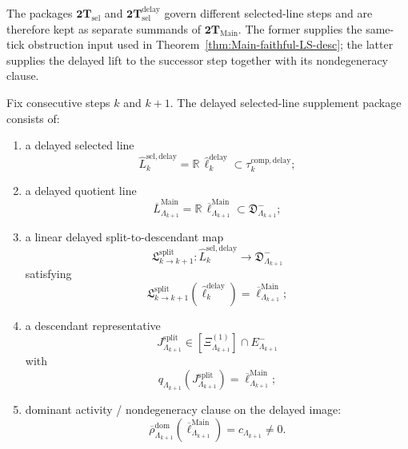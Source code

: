 \begin{remark}
\label{rem:Main-sel-separate}
The packages \(\mathbf{2T}_{\mathrm{sel}}\) and
\(\mathbf{2T}_{\mathrm{sel}}^{\mathrm{delay}}\) govern different
selected-line steps and are therefore kept as separate summands of
\(\mathbf{2T}_{\mathrm{Main}}\). The former supplies the
same-tick obstruction input used in
Theorem~\ref{thm:Main-faithful-LS-desc}; the latter supplies the delayed
lift to the successor step together with its nondegeneracy
clause.
\end{remark}

\begin{definition}
\label{def:2T-sel-delay}
Fix consecutive steps \(k\) and \(k+1\).
The delayed selected-line supplement package consists of:
\begin{enumerate}[label=\textnormal{(\roman*)},leftmargin=*,itemsep=0.3em]
\item a delayed selected line
  \[
  \widehat L^{\mathrm{sel,delay}}_k
  =
  \mathbb R\,\widehat\ell^{\mathrm{delay}}_k
  \subset
  \tau^{\mathrm{comp,delay}}_k;
  \]
\item a delayed quotient line
  \[
  \overline L^{\mathrm{Main}}_{\Lambda_{k+1}}
  =
  \mathbb R\,\overline\ell^{\mathrm{Main}}_{\Lambda_{k+1}}
  \subset
  \mathfrak D^-_{\Lambda_{k+1}};
  \]
\item a linear delayed split-to-descendant map
  \[
  \mathfrak L^{\mathrm{split}}_{k\to k+1}:
  \widehat L^{\mathrm{sel,delay}}_k
  \longrightarrow
  \mathfrak D^-_{\Lambda_{k+1}}
  \]
  satisfying
  \[
  \mathfrak L^{\mathrm{split}}_{k\to k+1}
  (\widehat\ell^{\mathrm{delay}}_k)
  =
  \overline\ell^{\mathrm{Main}}_{\Lambda_{k+1}};
  \]
\item a descendant representative
  \[
  J^{\mathrm{split}}_{\Lambda_{k+1}}
  \in
  [\Xi^{(1)}_{\Lambda_{k+1}}]\cap E^-_{\Lambda_{k+1}}
  \]
  with
  \[
  q_{\Lambda_{k+1}}(J^{\mathrm{split}}_{\Lambda_{k+1}})
  =
  \overline\ell^{\mathrm{Main}}_{\Lambda_{k+1}};
  \]
\item dominant activity / nondegeneracy clause on the delayed image:
  \[
  \overline\rho^{\mathrm{dom}}_{\Lambda_{k+1}}
  (\overline\ell^{\mathrm{Main}}_{\Lambda_{k+1}})
  =
  c_{\Lambda_{k+1}}
  \neq 0.
  \]
\end{enumerate}
\end{definition}

